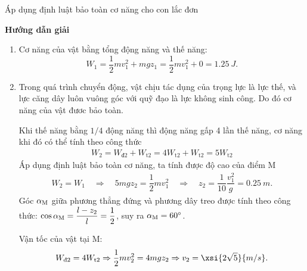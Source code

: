 \begin{dang}{Áp dụng định luật bảo toàn cơ năng cho con lắc đơn}
	
	{\begin{center}
			\textbf{Hướng dẫn giải}
		\end{center}
		
		\begin{enumerate}[label=\alph*)]
			\item 			
			Cơ năng của vật bằng tổng động năng và thế năng:
			$$W_1 = \dfrac{1}{2}mv_1^2 + mgz_1 = \dfrac{1}{2}mv_1^2 + 0 = \SI{1.25}{J}.$$
			
			\item Trong quá trình chuyển động, vật chịu tác dụng của trọng lực là lực thế, và lực căng dây luôn vuông góc với quỹ đạo là lực không sinh công. 
			Do đó cơ năng của vật đươc bảo toàn. 
			
			Khi thế năng bằng $1/4$ động năng thì động năng gấp 4 lần thế năng, cơ năng khi đó có thể tính theo công thức 
			\begin{align*}
				W_2 = W_\text{đ2} + W_\text{t2} = 4 W_\text{t2} + W_\text{t2} = 5 W_\text{t2} 
			\end{align*}
			Áp dụng định luật bảo toàn cơ năng, ta tính được độ cao của điểm M	
			\begin{align*}
				W_2= W_1 \quad\Rightarrow\quad 5mgz_2 = \dfrac{1}{2}mv_1^2 \quad \Rightarrow \quad z_2 = \dfrac{1}{10}\dfrac{v_1^2}{g}=\SI{0.25}{m}.
			\end{align*}
			Góc $\alpha_\text M$ giữa phương thẳng đứng và phương dây treo được tính theo công thức: $\cos \alpha_\text M = \dfrac{l-z_2}{l} = \dfrac{1}{2}$, suy ra $\alpha_\text M = 60^\circ$.
			
			Vận tốc của vật tại M:
			$$W_\text{đ2} = 4 W_\text{t2} \Rightarrow \dfrac{1}{2}mv_2^2 = 4 mgz_2 \Rightarrow v_2 = \xsi{2\sqrt 5}{m/s}.$$
		\end{enumerate}
		
}
\end{dang}
